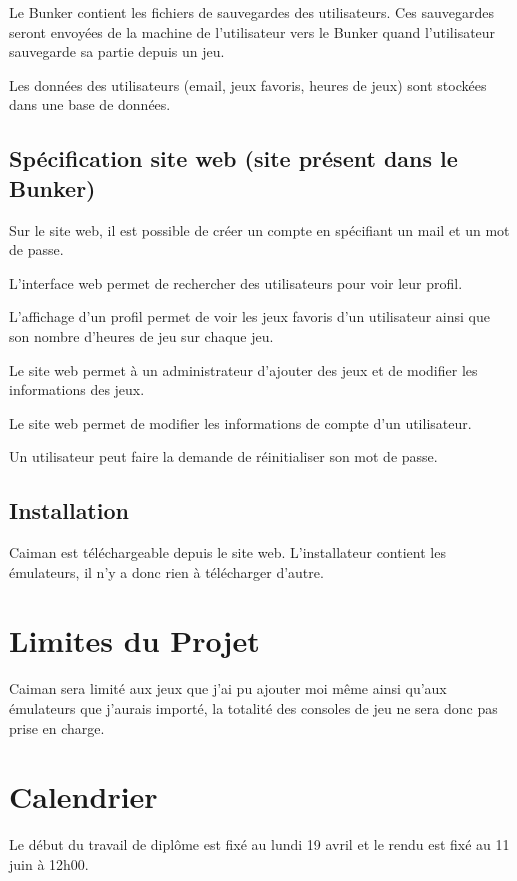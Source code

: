 \documentclass[a4paper,12pt,french]{sphinxmanual}
\begin{document}
\sphinxAtStartPar
Le Bunker contient les fichiers de sauvegardes des utilisateurs. Ces sauvegardes seront envoyées de la machine de l’utilisateur vers le Bunker quand l’utilisateur sauvegarde sa partie depuis un jeu.

\sphinxAtStartPar
Les données des utilisateurs (email, jeux favoris, heures de jeux) sont stockées dans une base de données.


\subsection{Spécification site web (site présent dans le Bunker)}
\label{\detokenize{cdc:specification-site-web-site-present-dans-le-bunker}}
\sphinxAtStartPar
Sur le site web, il est possible de créer un compte en spécifiant un mail et un mot de passe.

\sphinxAtStartPar
L’interface web permet de rechercher des utilisateurs pour voir leur profil.

\sphinxAtStartPar
L’affichage d’un profil permet de voir les jeux favoris d’un utilisateur ainsi que son nombre d’heures de jeu sur chaque jeu.

\sphinxAtStartPar
Le site web permet à un administrateur d’ajouter des jeux et de modifier les informations des jeux.

\sphinxAtStartPar
Le site web permet de modifier les informations de compte d’un utilisateur.

\sphinxAtStartPar
Un utilisateur peut faire la demande de réinitialiser son mot de passe.


\subsection{Installation}
\label{\detokenize{cdc:installation}}
\sphinxAtStartPar
Caiman est téléchargeable depuis le site web. L’installateur contient les émulateurs, il n’y a donc rien à télécharger d’autre.


\section{Limites du Projet}
\label{\detokenize{cdc:limites-du-projet}}
\sphinxAtStartPar
Caiman sera limité aux jeux que j’ai pu ajouter moi même ainsi qu’aux émulateurs que j’aurais importé, la totalité des consoles de jeu ne sera donc pas prise en charge.


\section{Calendrier}
\label{\detokenize{cdc:calendrier}}
\sphinxAtStartPar
Le début du travail de diplôme est fixé au lundi 19 avril et le rendu est fixé au 11 juin à 12h00.
\end{document}
